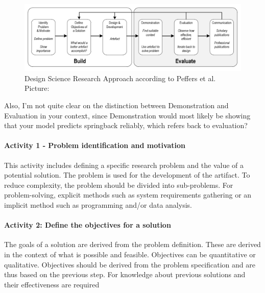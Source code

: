  \begin{figure}[H]
	\centering
	\includegraphics[width=1.1\linewidth]{chap3/images/dsr_process.png}
	\caption[DSR Process]{Design Science Research Approach according to Peffers et al. Picture: \cite[p. 72]{sonnenberg_evaluationpatternsdesign_2012}}
	\label{fig:dsr_process}
\end{figure}


Also, I’m not quite clear on the distinction between Demonstration and Evaluation in your context, since Demonstration would most likely be showing that your model predicts springback reliably, which refers back to evaluation?

\paragraph{Activity 1 - Problem identification and motivation} 
This activity includes defining a specific research problem and the value of a potential solution. 
The problem is used for the development of the artifact. To reduce complexity, the problem should be divided into sub-problems. For problem-solving, explicit methods such as system requirements gathering or an implicit method such as programming and/or data analysis. 
\cite[p. 52]{peffers_designscienceresearch_2007}

\paragraph{Activity 2: Define the objectives for a solution} 
The goals of a solution are derived from the problem definition. These are derived in the context of what is possible and feasible.
Objectives can be quantitative or qualitative. Objectives should be derived from the
problem specification and are thus based on the previous step. 
For knowledge about previous solutions and their effectiveness are required 
\cite[p. 55]{peffers_designscienceresearch_2007}

